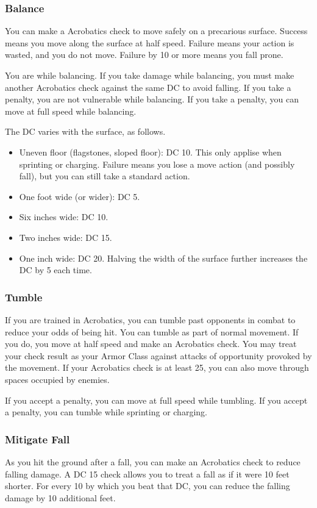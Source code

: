 \subsubsection{Balance}
You can make a Acrobatics check to move safely on a precarious surface. Success means you move along the surface at half speed. Failure means your action is wasted, and you do not move. Failure by 10 or more means you fall prone.

You are \vulnerable while balancing. If you take damage while balancing, you must make another Acrobatics check against the same DC to avoid falling. If you take a  penalty, you are not vulnerable while balancing. If you take a  penalty, you can move at full speed while balancing.

The DC varies with the surface, as follows.

\begin{itemize}
  \item Uneven floor (flagstones, sloped floor): DC 10. This only applise when sprinting or charging. Failure means you lose a move action (and possibly fall), but you can still take a standard action.
  \item One foot wide (or wider): DC 5. 
  \item Six inches wide: DC 10.
  \item Two inches wide: DC 15.
  \item One inch wide: DC 20. Halving the width of the surface further increases the DC by 5 each time.
\end{itemize}

\subsubsection{Tumble}\label{Tumble}
If you are trained in Acrobatics, you can tumble past opponents in combat to reduce your odds of being hit. You can tumble as part of normal movement. If you do, you move at half speed and make an Acrobatics check. You may treat your check result as your Armor Class against attacks of opportunity provoked by the movement. If your Acrobatics check is at least 25, you can also move through spaces occupied by enemies.

If you accept a  penalty, you can move at full speed while tumbling. If you accept a  penalty, you can tumble while sprinting or charging.

\subsubsection{Mitigate Fall}
As you hit the ground after a fall, you can make an Acrobatics check to reduce falling damage. A DC 15 check allows you to treat a fall as if it were 10 feet shorter. For every 10 by which you beat that DC, you can reduce the falling damage by 10 additional feet.

